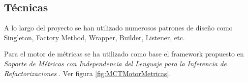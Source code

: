 \subsection{Técnicas}
A lo largo del proyecto se han utilizado numerosos patrones de diseño \cite{gamma_patrones_2002} como Singleton, Factory Method, Wrapper, Builder, Listener, etc.

Para el motor de métricas se ha utilizado como base el framework propuesto en \textit{Soporte de Métricas con Independencia del Lenguaje para la Inferencia de Refactorizaciones} \cite{marticorena_soporte_2005}. Ver figura \ref{fig:MCTMotorMetricas}.
